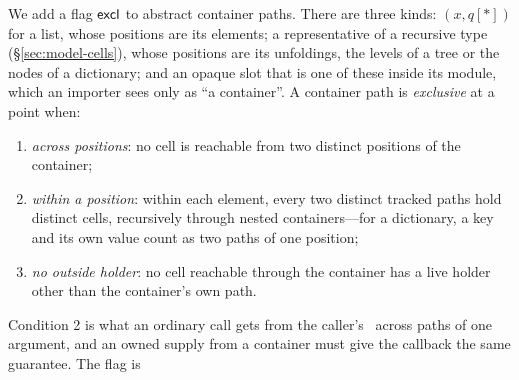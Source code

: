 We add a flag $\mathsf{excl}$ to abstract container paths. There are three kinds: $(x, q[\ast])$ for a list, whose
positions are its elements; a representative of a recursive type (\S\ref{sec:model-cells}), whose
positions are its unfoldings, the levels of a tree or the nodes of a dictionary; and an opaque slot that
is one of these inside its module, which an importer sees only as ``a container''. A container path is
\emph{exclusive} at a point when:
\begin{enumerate}
\item \emph{across positions}: no cell is reachable from two distinct positions of the container;
\item \emph{within a position}: within each element, every two distinct tracked paths hold distinct
cells, recursively through nested containers---for a dictionary, a key and its own value count as two
paths of one position;
\item \emph{no outside holder}: no cell reachable through the container has a live holder other than
the container's own path.
\end{enumerate}
Condition 2 is what an ordinary call gets from the caller's \Disjoint\ across paths of one argument,
and an owned supply from a container must give the callback the same guarantee. The flag is
